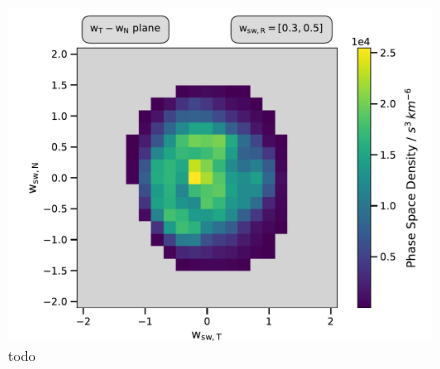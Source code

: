 \begin{figure}[h]
	\includegraphics[width=.8\textwidth]{Figures/cart_50_ps_R.pdf}
	\centering
	\caption{todo}
	\label{fig:psd_50}
\end{figure}


